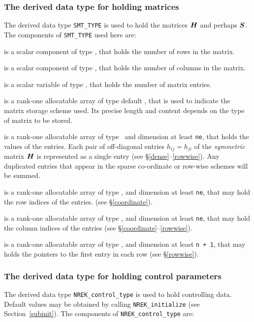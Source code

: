 \documentclass{galahad}
\newcommand{\packagename}{NREK}
\begin{document}
\subsubsection{The derived data type for holding matrices}\label{typesmt}
The derived data type {\tt SMT\_TYPE} is used to hold the matrices ${\bm{H}}$
and perhaps ${\bm{S}}$.
The components of {\tt SMT\_TYPE} used here are:

\begin{description}

 is a scalar component of type \integer,
that holds the number of rows in the matrix.

 is a scalar component of type \integer,
that holds the number of columns in the matrix.

 is a scalar variable of type \integer, that
holds the number of matrix entries.

 is a rank-one allocatable array of type default \character, that
is used to indicate the matrix storage scheme used. Its precise length and
content depends on the type of matrix to be stored.

 is a rank-one allocatable array of type \realdp\,
and dimension at least {\tt ne}, that holds the values of the entries.
Each pair of off-diagonal entries $h_{ij} = h_{ji}$ of the {\em symmetric}
matrix ${\bm{H}}$ is represented as a single entry
(see \S\ref{dense}--\ref{rowwise}).
Any duplicated entries that appear in the sparse
co-ordinate or row-wise schemes will be summed.

 is a rank-one allocatable array of type \integer,
and dimension at least {\tt ne}, that may hold the row indices of the entries.
(see \S\ref{coordinate}).

 is a rank-one allocatable array of type \integer,
and dimension at least {\tt ne}, that may hold the column indices of the entries
(see \S\ref{coordinate}--\ref{rowwise}).

 is a rank-one allocatable array of type \integer,
and dimension at least {\tt n + 1}, that may holds the pointers to
the first entry in each row (see \S\ref{rowwise}).

\end{description}


\subsubsection{The derived data type for holding control
 parameters}\label{typecontrol}
The derived data type
{\tt \packagename\_control\_type}
is used to hold controlling data. Default values may be obtained by calling
{\tt \packagename\_initialize}
(see Section~\ref{subinit}). The components of
{\tt \packagename\_control\_type}
are:
\end{document}
